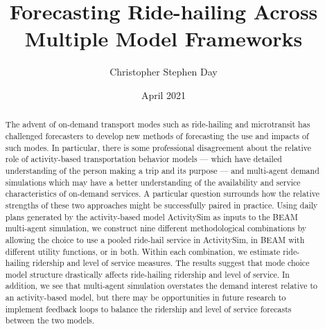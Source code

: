 \documentclass[fancy, masters]{byuthesis}
\title{Forecasting Ride-hailing Across\\
\hspace*{0.333em}Multiple Model Frameworks}
\author{Christopher Stephen Day}
\date{April 2021}
\begin{document}
	\frontmatter

	\titlepage
	\clearpage

	\customtitlepage
	\clearpage


    \begin{abstract}
  The advent of on-demand transport modes such as ride-hailing and microtransit has challenged forecasters to develop new methods of forecasting the use and impacts of such modes. In particular, there is some professional disagreement about the relative role of activity-based transportation behavior models --- which have detailed understanding of the person making a trip and its purpose --- and multi-agent demand simulations which may have a better understanding of the availability and service characteristics of on-demand services. A particular question surrounds how the relative strengths of these two approaches might be successfully paired in practice. Using daily plans generated by the activity-based model ActivitySim as inputs to the BEAM multi-agent simulation, we construct nine different methodological combinations by allowing the choice to use a pooled ride-hail service in ActivitySim, in BEAM with different utility functions, or in both. Within each combination, we estimate ride-hailing ridership and level of service measures. The results suggest that mode choice model structure drastically affects ride-hailing ridership and level of service. In addition, we see that multi-agent simulation overstates the demand interest relative to an activity-based model, but there may be opportunities in future research to implement feedback loops to balance the ridership and level of service forecasts between the two models.
  \end{abstract}
  	\clearpage
\end{document}
